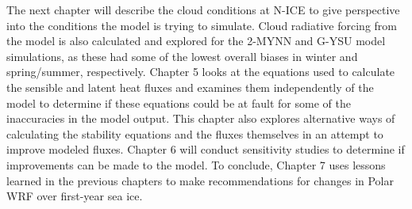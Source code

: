 The next chapter will describe the cloud conditions at N-ICE to give perspective into the conditions the model is trying to simulate. Cloud radiative forcing from the model is also calculated and explored for the 2-MYNN and G-YSU model simulations, as these had some of the lowest overall biases in winter and spring/summer, respectively. Chapter 5 looks at the equations used to calculate the sensible and latent heat fluxes and examines them independently of the model to determine if these equations could be at fault for some of the inaccuracies in the model output. This chapter also explores alternative ways of calculating the stability equations and the fluxes themselves in an attempt to improve modeled fluxes. Chapter 6 will conduct sensitivity studies to determine if improvements can be made to the model. To conclude, Chapter 7 uses lessons learned in the previous chapters to make recommendations for changes in Polar WRF over first-year sea ice. 